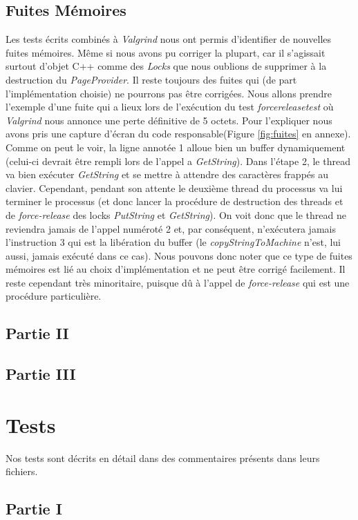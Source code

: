 \documentclass{article}
\begin{document}
\subsection{Fuites Mémoires}
Les tests écrits combinés à \textit{Valgrind} nous ont permis d'identifier de nouvelles fuites mémoires. Même si nous avons pu corriger la plupart, car il s'agissait
surtout d'objet C++ comme des \textit{Locks} que nous oublions de supprimer à la destruction du \textit{PageProvider}. Il reste toujours des fuites qui
(de part l'implémentation choisie) ne pourrons pas être corrigées. Nous allons prendre l'exemple d'une fuite qui a lieux lors de l'exécution du test \textit{forcereleasetest} où
\textit{Valgrind} nous annonce une perte définitive de 5 octets. Pour l'expliquer nous avons pris une capture d'écran du code responsable(Figure \ref{fig:fuites} en annexe).
Comme on peut le voir, la ligne annotée 1 alloue bien un buffer dynamiquement (celui-ci devrait être rempli lors de l'appel a \textit{GetString}). Dans l'étape 2, le thread va bien
exécuter \textit{GetString} et se mettre à attendre des caractères frappés au clavier. Cependant, pendant son attente le deuxième thread du processus va lui terminer le processus 
(et donc lancer la procédure de destruction des threads et de \textit{force-release} des locks \textit{PutString} et \textit{GetString}). On voit donc que le thread ne reviendra jamais de l'appel
numéroté 2 et, par conséquent, n'exécutera jamais l'instruction 3 qui est la libération du buffer (le \textit{copyStringToMachine} n'est, lui aussi, jamais exécuté dans ce cas).
Nous pouvons donc noter que ce type de fuites mémoires est lié au choix d'implémentation et ne peut être corrigé facilement. Il reste cependant très minoritaire, puisque dû à l'appel
de \textit{force-release} qui est une procédure particulière.
\subsection{Partie II}

\subsection{Partie III}


\section{Tests}
Nos tests sont décrits en détail dans des commentaires présents dans leurs fichiers.
\subsection{Partie I}
\end{document}
